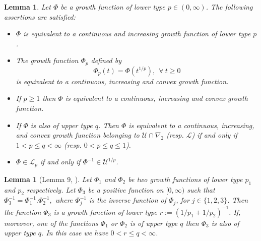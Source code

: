\documentclass[a4paper,12pt,intlimits,oneside]{amsart}
\newtheorem{lemme}[theorem]{Lemma}
\theoremstyle{definition}
\numberwithin{equation}{section}
\theoremstyle{definition}
\begin{document}
\begin{lemme}\label{pro:maiaqaq1q8}
Let  $\Phi$ be a growth function of lower type $p\in (0, \infty)$. The following assertions are satisfied: 
\begin{itemize}
\item[(i)]  $\Phi$ is equivalent to a continuous and increasing  growth function of lower type $p$.
\item[(ii)] The growth function $\Phi_{p}$ defined by
\begin{equation}\label{eq:suiaqaq8n}
\Phi_{p}(t)=\Phi\left( t^{1/p}\right),~~\forall~t\geq 0\end{equation}
is equivalent to a continuous, increasing and convex growth function.
\item[(iii)]   If $p \geq 1$ then $\Phi$ is equivalent to a continuous, increasing and convex growth function.
\item[(iv)] If $\Phi$ is also of upper type $q$.  Then $\Phi$ is equivalent to a continuous, increasing, and convex growth function belonging to $\mathscr{U} \cap \nabla_{2}$ (resp. $\mathscr{L}$) if and only if $1<p \leq q< \infty$ (resp.  $0<p \leq q \leq 1$).
\item[(v)]   $\Phi \in \mathscr{L}_{p}$ if and only if  $\Phi^{-1} \in \mathscr{U}^{1/p}$.

\end{itemize}
\end{lemme}


\begin{lemme}[Lemma 9, \cite{djefeuto1}]\label{pro:mainfqmpq5}
Let  $\Phi_{1}$ and $\Phi_{2}$  be two growth functions of lower type  $p_{1}$ and $p_{2}$ respectively. Let  $\Phi_{3}$ be a positive function on $[0, \infty)$ such that $\Phi_{3}^{-1} = \Phi_{1}^{-1}.\Phi_{2}^{-1},$ where  $\Phi_{j}^{-1}$ is the inverse function of  $\Phi_{j}$, for  $j\in \{1,2,3\}$. 
Then the function $\Phi_{3}$ is a growth function of lower type $r:=\left( 1/p_{1}+1/p_{2}  \right)^{-1}$. 
If, moreover, one of the functions  $\Phi_{1}$ or  $\Phi_{2}$ is of upper type $q$ then $\Phi_{3}$ is also of upper type $q$. In this case we have $0<r\leq q <\infty$.
\end{lemme}
\end{document}
